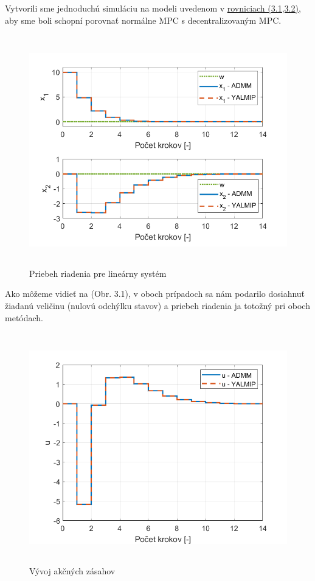 Vytvorili sme jednoduchú simuláciu na modeli uvedenom v \hyperref[math:model_HB]{rovniciach (3.1,3.2)}, aby sme boli schopní porovnať normálne MPC s decentralizovaným MPC.
\begin{figure}[H]
	\centering
	\includegraphics[width=13cm,height=10cm]{images/Hmotny_bod/Priebeh_riadenia}
	\caption{Priebeh riadenia pre lineárny systém}
	\label{fig1: PRLS}
\end{figure}
Ako môžeme vidieť na (Obr. 3.1), v oboch prípadoch sa nám podarilo dosiahnuť žiadanú veličinu (nulovú odchýlku stavov) a priebeh riadenia ja totožný pri oboch metódach.
\begin{figure}[H]
	\centering
	\includegraphics[width=13cm,height=10cm]{images/Hmotny_bod/Akcne_zasahy}
	\caption{Vývoj akčných zásahov}
	\label{fig2:AZLS}
\end{figure}
